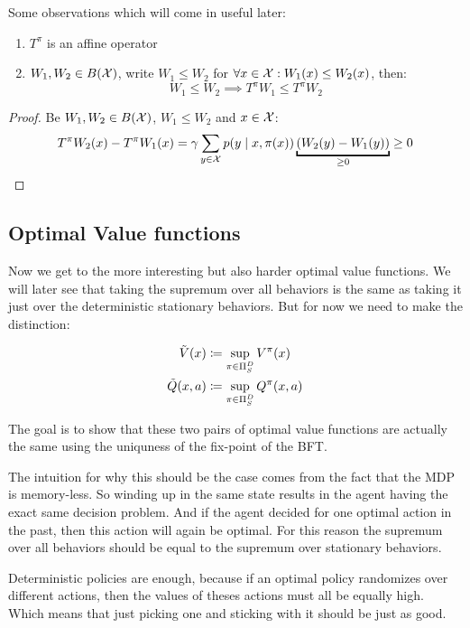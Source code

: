 \begin{remark}\label{properties T^pi} Some observations which will come in useful later:
	\begin{enumerate}
		\item \(T^\pi\) is an affine operator
		\item \(W_1,W_2\in B(\mathcal{X})\), write \(W_1 \le W_2\) for \(\forall x\in\mathcal{X}:W_1(x)\le W_2(x)\), then:
		\[W_1\le W_2 \implies T^\pi W_1\le T^\pi W_2\]
	\end{enumerate}
\end{remark}

\begin{proof}
 Be \(W_1,W_2\in B(\mathcal{X})\), \(W_1\le W_2\) and \(x\in\mathcal{X}\):
\[
	T^\pi W_2 (x) - T^\pi W_1(x) 
	= \gamma \sum_{y\in\cX} p(y\mid x,\pi(x)) \underbracket{(W_2(y)-W_1(y))}_{\ge 0} 
	\ge 0
	\qedhere
\]
\end{proof}

\subsection{Optimal Value functions}
Now we get to the more interesting but also harder optimal value functions. We will later see that taking the supremum over all behaviors is the same as taking it just over the deterministic stationary behaviors. But for now we need to make the distinction:

\begin{definition}
\begin{align*}
	\tilde{V}(x)&\coloneqq \sup_{\pi\in\Pi_S^D} V^\pi(x)\\
	\tilde{Q}(x,a)&\coloneqq \sup_{\pi\in\Pi_S^D} Q^\pi(x,a)
\end{align*}
\end{definition}

The goal is to show that these two pairs of optimal value functions are actually the same using the uniquness of the fix-point of the BFT. 

The intuition for why this should be the case comes from the fact that the MDP is memory-less. So winding up in the same state results in the agent having the exact same decision problem. And if the agent decided for one optimal action in the past, then this action will again be optimal. For this reason the supremum over all behaviors should be equal to the supremum over stationary behaviors. 

Deterministic policies are enough, because if an optimal policy randomizes over different actions, then the values of theses actions must all be equally high. Which means that just picking one and sticking with it should be just as good.

